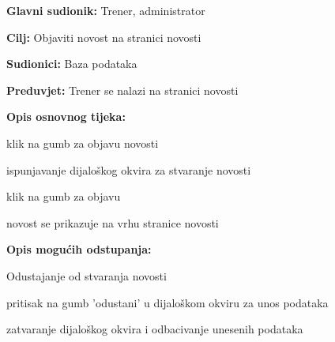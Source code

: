 					\noindent {}
					\begin{packed_item}
	
						\item \textbf{Glavni sudionik: }Trener, administrator
						\item  \textbf{Cilj: } Objaviti novost na stranici novosti
						\item  \textbf{Sudionici: } Baza podataka
						\item  \textbf{Preduvjet: } Trener se nalazi na stranici novosti
						\item  \textbf{Opis osnovnog tijeka:}
						
						\item[] \begin{packed_enum}
	
							\item klik na gumb za objavu novosti
							\item ispunjavanje dijaloškog okvira za stvaranje novosti
							\item klik na gumb za objavu
							\item novost se prikazuje na vrhu stranice novosti
							
						\end{packed_enum}
						
						\item  \textbf{Opis mogućih odstupanja:}
						
						\item[] \begin{packed_item}
	
							\item[3.a] Odustajanje od stvaranja novosti
							\item[] \begin{packed_enum}
								
								\item pritisak na gumb 'odustani' u dijaloškom okviru za unos podataka
								\item zatvaranje dijaloškog okvira i odbacivanje unesenih podataka
								
							\end{packed_enum}
							
						\end{packed_item}
					\end{packed_item}
					
